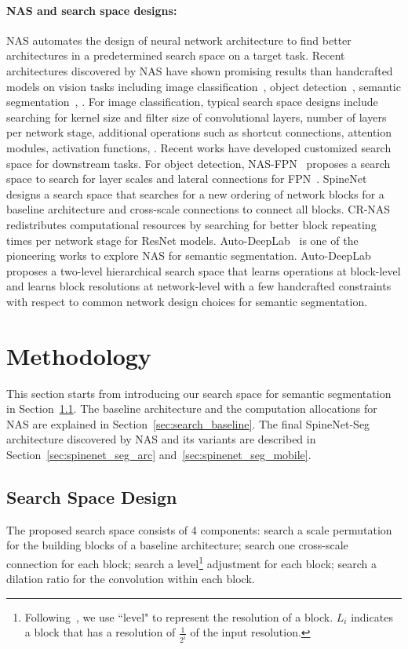 \documentclass[10pt,twocolumn,letterpaper]{article}
\begin{document}
\paragraph{NAS and search space designs:} NAS automates the design of neural network architecture to find better architectures in a predetermined search space on a target task. Recent architectures discovered by NAS have shown promising results than handcrafted models on vision tasks including image classification~\cite{nasnet,amoebanet,mnasnet,mobilenetv3}, object detection~\cite{nasfpn,spinenet,Du2020EfficientSB,detnet,nasfcos,xu2019autofpn,Liang2020ComputationRF}, semantic segmentation~\cite{autodeeplab,Shaw2019SqueezeNASFN}, \etc. For image classification, typical search space designs include searching for kernel size and filter size of convolutional layers, number of layers per network stage, additional operations such as shortcut connections, attention modules, activation functions, \etc. Recent works have developed customized search space for downstream tasks. For object detection, NAS-FPN~\cite{nasfpn} proposes a search space to search for layer scales and lateral connections for FPN~\cite{fpn}. SpineNet~\cite{spinenet} designs a search space that searches for a new ordering of network blocks for a baseline architecture and cross-scale connections to connect all blocks. CR-NAS~\cite{Liang2020ComputationRF} redistributes computational resources by searching for better block repeating times per network stage for ResNet models. Auto-DeepLab~\cite{autodeeplab} is one of the pioneering works to explore NAS for semantic segmentation. Auto-DeepLab proposes a two-level hierarchical search space that learns operations at block-level and learns block resolutions at network-level with a few handcrafted constraints with respect to common network design choices for semantic segmentation.

\section{Methodology}\label{sec:methodology}
This section starts from introducing our search space for semantic segmentation in Section~\ref{sec:search_space}. The baseline architecture and the computation allocations for NAS are explained in Section~\ref{sec:search_baseline}. The final SpineNet-Seg architecture discovered by NAS and its variants are described in Section~\ref{sec:spinenet_seg_arc} and~\ref{sec:spinenet_seg_mobile}. 

\subsection{Search Space Design}\label{sec:search_space}
The proposed search space consists of 4 components: search a scale permutation for the building blocks of a baseline architecture; search one cross-scale connection for each block; search a level\footnote{Following~\cite{spinenet}, we use ``level" to represent the resolution of a block. $L_i$ indicates a block that has a resolution of $\frac{1}{2^i}$ of the input resolution.} adjustment for each block; search a dilation ratio for the convolution within each block.
\end{document}
